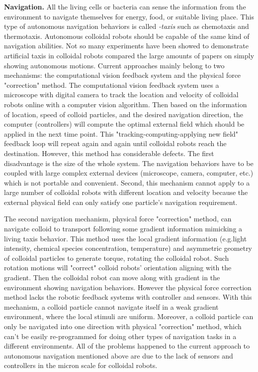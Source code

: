 \textbf{Navigation.} All the living cells or bacteria can sense the information from the environment to navigate themselves for energy, food, or suitable living place. This type of autonomous navigation behaviors is called \textit{-taxis} such as chemotaxis and thermotaxis. Autonomous colloidal robots should be capable of the same kind of navigation abilities. Not so many experiments have been showed to demonstrate  artificial taxis in colloidal robots compared the large amounts of papers on simply showing autonomous motions. Current approaches mainly belong to two mechanisms: the computational vision feedback system and the physical force "correction" method. The computational vision feedback system uses a microscope with digital camera to track the location and velocity of colloidal robots online with a computer vision algorithm. Then based on the information of location, speed of colloid particles, and the desired navigation direction, the computer (controllers) will compute the optimal external field which should be applied in the next time point. This "tracking-computing-applying new field" feedback loop will repeat again and again until colloidal robots reach the destination\autocite{li2017autonomous,han2017sequence}. However, this method has considerable defects. The first disadvantage is the size of the whole system. The navigation behaviors have to be coupled with large complex external devices (microscope, camera, computer, etc.) which is not portable and convenient. Second, this mechanism cannot apply to a large number of colloidal robots with different location and velocity because the external physical field can only satisfy one particle's navigation requirement. 

The second  navigation mechanism, physical force "correction" method, can navigate  colloid to transport following  some gradient information mimicking a living taxis behavior. This method uses the local gradient information (e.g.light intensity, chemical species concentration, temperature) and asymmetric geometry of colloidal particles to generate torque, rotating  the colloidal robot. Such rotation motions will "correct" colloid robots' orientation aligning with the gradient. Then the colloidal robot can move along with gradient in the environment showing navigation behaviors\autocite{brosseau2019relating,ten2014gravitaxis,lozano2016phototaxis,baker2019fight}. However the physical force correction method  lacks the robotic feedback systems with controller and sensors. With this mechanism, a colloid particle cannot navigate itself in a weak gradient environment, where the local stimuli are uniform. Moreover, a colloid particle can only be navigated into one direction with physical "correction" method, which can't be easily re-programmed for doing other types of navigation tasks in a different environments. All of the problems happened to the current approach to autonomous navigation mentioned above are due to the lack of sensors and controllers in the micron scale for colloidal robots.





